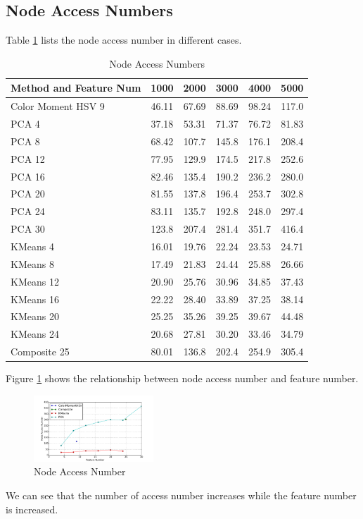\documentclass{acm_proc_article-sp}
\begin{document}
\subsection{Node Access Numbers}
Table \ref{table:accessnum} lists the node access number in different cases.
\begin{table} \centering 
\begin{tabular}{|p{2.1cm}|c|c|c|c|c|}
    \hline
    Method and Feature Num & 1000 & 2000 & 3000 & 4000 & 5000 \\ \hline
    Color Moment HSV 9 & 46.11 & 67.69 & 88.69 & 98.24 & 117.0 \\ \hline
    PCA 4 & 37.18 & 53.31 & 71.37 & 76.72 & 81.83 \\ \hline
    PCA 8 & 68.42 & 107.7 & 145.8 & 176.1 & 208.4 \\ \hline
    PCA 12 & 77.95 & 129.9 & 174.5 & 217.8 & 252.6 \\ \hline
    PCA 16 & 82.46 & 135.4 & 190.2 & 236.2 & 280.0 \\ \hline
    PCA 20 & 81.55 & 137.8 & 196.4 & 253.7 & 302.8 \\ \hline
    PCA 24 & 83.11 & 135.7 & 192.8 & 248.0 & 297.4 \\ \hline
    PCA 30 & 123.8 & 207.4 & 281.4 & 351.7 & 416.4 \\ \hline
    KMeans 4 & 16.01 & 19.76 & 22.24 & 23.53 & 24.71 \\ \hline
    KMeans 8 & 17.49 & 21.83 & 24.44 & 25.88 & 26.66 \\ \hline
    KMeans 12 & 20.90 & 25.76 & 30.96 & 34.85 & 37.43 \\ \hline
    KMeans 16 & 22.22 & 28.40 & 33.89 & 37.25 & 38.14 \\ \hline
    KMeans 20 & 25.25 & 35.26 & 39.25 & 39.67 & 44.48 \\ \hline
    KMeans 24 & 20.68 & 27.81 & 30.20 & 33.46 & 34.79 \\ \hline
    Composite 25 & 80.01 & 136.8 & 202.4 & 254.9 & 305.4 \\ \hline
\end{tabular}
    \caption{Node Access Numbers}
    \label{table:accessnum}
\end{table}


Figure \ref{fig:accessnum} shows the relationship between node access number
    and feature number.
\begin{figure} \centering
    \includegraphics[width=0.4\textwidth]{data/accessnum.pdf}
    \caption{Node Access Number}
    \label{fig:accessnum}
\end{figure}
We can see that the number of access number increases while
    the feature number is increased.
\end{document}
